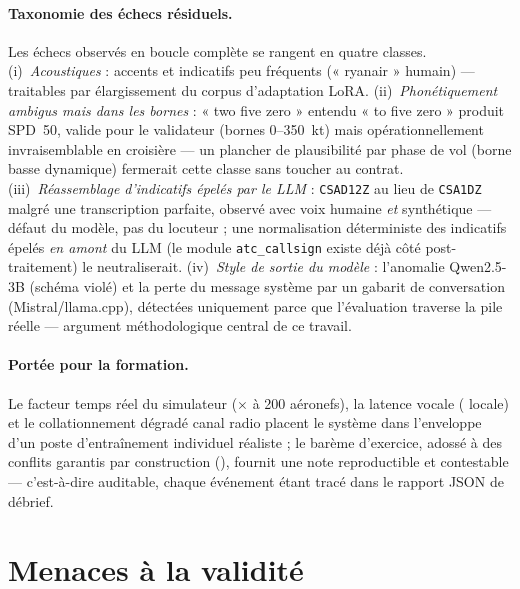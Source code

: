 \documentclass[10pt,a4paper]{article}
\newcommand{\syst}[1]{\texttt{#1}}
\begin{document}
\paragraph{Taxonomie des échecs résiduels.} Les échecs observés en boucle
complète se rangent en quatre classes. (i)~\emph{Acoustiques} : accents et
indicatifs peu fréquents (« ryanair » humain) --- traitables par
élargissement du corpus d'adaptation LoRA. (ii)~\emph{Phonétiquement
ambigus mais dans les bornes} : « two five zero » entendu « to five zero »
produit SPD~50, valide pour le validateur (bornes 0--350~kt) mais
opérationnellement invraisemblable en croisière --- un plancher de
plausibilité par phase de vol (borne basse dynamique) fermerait cette
classe sans toucher au contrat. (iii)~\emph{Réassemblage d'indicatifs
épelés par le LLM} : \syst{CSAD12Z} au lieu de \syst{CSA1DZ} malgré une
transcription parfaite, observé avec voix humaine \emph{et} synthétique ---
défaut du modèle, pas du locuteur ; une normalisation déterministe des
indicatifs épelés \emph{en amont} du LLM (le module \syst{atc\_callsign}
existe déjà côté post-traitement) le neutraliserait. (iv)~\emph{Style de
sortie du modèle} : l'anomalie Qwen2.5-3B (schéma violé) et la perte du
message système par un gabarit de conversation (Mistral/llama.cpp),
détectées uniquement parce que l'évaluation traverse la pile réelle ---
argument méthodologique central de ce travail.

\paragraph{Portée pour la formation.} Le facteur temps réel du simulateur
($\times$\nScalingDeuxCents{} à 200 aéronefs), la latence vocale
(\nEELatMoy{} locale) et le collationnement dégradé canal radio placent le
système dans l'enveloppe d'un poste d'entraînement individuel réaliste ; le
barème d'exercice, adossé à des conflits garantis par construction
(\nConflitGarantie), fournit une note reproductible et contestable ---
c'est-à-dire auditable, chaque événement étant tracé dans le rapport JSON
de débrief.

\section{Menaces à la validité}
\label{sec:validite}
\end{document}
